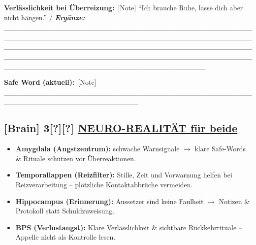 \textbf{Verlässlichkeit bei Überreizung:}\
[Note] ``Ich brauche Ruhe, lasse dich aber nicht hängen.'' / \emph{\textbf{Ergänze:}} \_\_\_\_\_\_\_\_\_\_\_\_\_\_\_\_\_\_\_\_\_\_\_\_\_\_\_\_\_\_\_\_\_\_\_\_\_\_\_\_\_\_\_\_\_\_\_\_\_\_\_\_\_\_\_\_\_\_\_\_\_\_\_\_\_\_\_\_\_\_\_\_\_\_\_\_\_\_\_\_\_\_\_\_\_\_\_\_\_\_\_\_\_\_\_\_\_\_\_\_\_\_\_\_\_\_\_\_\_\_\_\_\_\_\_\_\_\_\_\_\_\_\_\_\_\_\_\_\_\_\_\_\_\_\_\_\_\_\_\_\_\_\_\_\_\_\_\_\_\_\_\_\_\_\_\_\_\_\_\_\_\_\_\_\_\_\_\_\_\_\_\_\_\_\_\_\_\_\_\_\_\_\_\_\_\_\_\_\_\_\_\_\_\_\_\_\_\_\_\_\_\_\_\_\_\_\_\_\_\_\_\_\_\_\_\_\_\_\_\_\_\_\_\_\_\_\_\_\_\_\_

\textbf{Safe Word (aktuell):}\
[Note] \_\_\_\_\_\_\_\_\_\_\_\_\_\_\_\_\_\_\_\_\_\_\_\_\_\_\_\_\_\_\_\_\_\_\_\_\_\_\_\_\_\_\_\_\_\_\_\_\_\_\_\_\_\_\_\_\_\_\_\_\_\_\_\_\_\_\_\_\_\_\_\_\_\_

\hypertarget{neuro-realituxe4t-fuxfcr-beide}{%
\subsection{\texorpdfstring{[Brain] 3[?][?] \textbf{\ul{NEURO-REALITÄT für beide}}}{[Brain] 3[?][?] NEURO-REALITÄT für beide}}\label{neuro-realituxe4t-fuxfcr-beide}}

\begin{itemize}
\tightlist
\item
  \textbf{Amygdala (Angstzentrum):} schwache Warnsignale $\rightarrow$ klare Safe-Words \& Rituale schützen vor Überreaktionen.
\end{itemize}

\begin{itemize}
\tightlist
\item
  \textbf{Temporallappen (Reizfilter):} Stille, Zeit und Vorwarnung helfen bei Reizverarbeitung -- plötzliche Kontaktabbrüche vermeiden.
\end{itemize}

\begin{itemize}
\tightlist
\item
  \textbf{Hippocampus (Erinnerung):} Aussetzer sind keine Faulheit $\rightarrow$ Notizen \& Protokoll statt Schuldzuweisung.
\end{itemize}

\begin{itemize}
\tightlist
\item
  \textbf{BPS (Verlustangst):} Klare Verlässlichkeit \& sichtbare Rückkehrrituale -- Appelle nicht als Kontrolle lesen.
\end{itemize}


